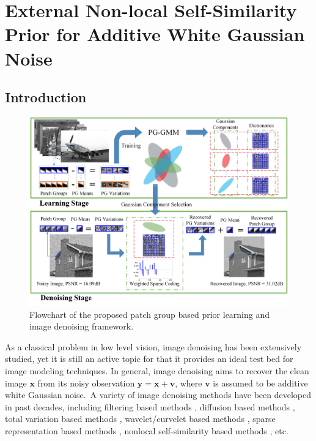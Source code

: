 %
\chapter{External Non-local Self-Similarity Prior for Additive White Gaussian Noise}
\label{sec:external}


\section{Introduction}
\begin{figure}
\centering
\includegraphics[width=0.74\linewidth]{images/pgpd/flowchart2.png}
\caption{Flowchart of the proposed patch group based prior learning and image denoising framework.}
\label{fig1}
\end{figure}

As a classical problem in low level vision, image denoising has been extensively studied, yet it is still an active topic for that it provides an ideal test bed for image modeling techniques. In general, image denoising aims to recover the clean image $\bm{x}$ from its noisy observation $\bm{y} = \bm{x} + \bm{v}$, where $\bm{v}$ is assumed to be additive white Gaussian noise.\ A variety of image denoising methods have been developed in past decades, including filtering based methods \cite{Tomasi1998}, diffusion based methods \cite{PeronaMalik1990}, total variation based methods \cite{rudin1992nonlinear,osher2005iterative}, wavelet/curvelet based methods \cite{softthresholding,bayesshrink,curvelet}, sparse representation based methods \cite{ksvd,lssc,ncsr}, nonlocal self-similarity based methods \cite{nlm,bm3d,nnm,wnnm}, etc.

